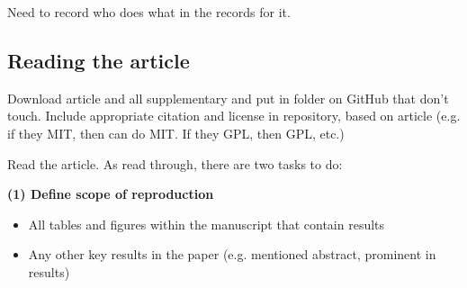 Need to record who does what in the records for it.

\subsection{Reading the article}


Download article and all supplementary and put in folder on GitHub that don't touch. Include appropriate citation and license in repository, based on article (e.g. if they MIT, then can do MIT. If they GPL, then GPL, etc.)

Read the article. As read through, there are two tasks to do:

\textbf{(1) Define scope of reproduction}
\begin{itemize}
    \item All tables and figures within the manuscript that contain results
    \item Any other key results in the paper (e.g. mentioned abstract, prominent in results)
\end{itemize}

